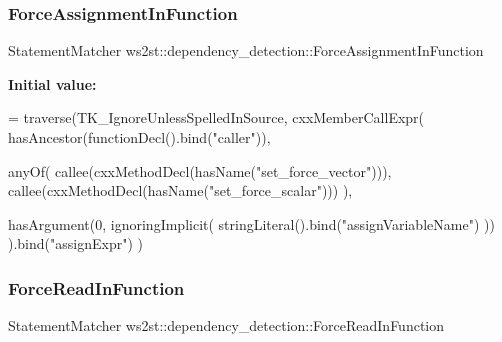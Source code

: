 \mbox{\label{namespacews2st_1_1dependency__detection_ab94bf8df1aeef0b1f73e23c616fb56aa}} 
\subsubsection{\texorpdfstring{Force\+Assignment\+In\+Function}{ForceAssignmentInFunction}}
{\footnotesize\ttfamily Statement\+Matcher ws2st\+::dependency\+\_\+detection\+::\+Force\+Assignment\+In\+Function}

{\bfseries Initial value\+:}
\begin{DoxyCode}
= traverse(TK\_IgnoreUnlessSpelledInSource, cxxMemberCallExpr(
        hasAncestor(functionDecl().bind(\textcolor{stringliteral}{"caller"})),

        anyOf(
            callee(cxxMethodDecl(hasName(\textcolor{stringliteral}{"set\_force\_vector"}))),
            callee(cxxMethodDecl(hasName(\textcolor{stringliteral}{"set\_force\_scalar"})))
        ),

        hasArgument(0, ignoringImplicit( stringLiteral().bind(\textcolor{stringliteral}{"assignVariableName"}) ))
    ).bind(\textcolor{stringliteral}{"assignExpr"})
)
\end{DoxyCode}
\mbox{\label{namespacews2st_1_1dependency__detection_ae0981b485fc9d9a27c5d5e1385a08919}} 
\subsubsection{\texorpdfstring{Force\+Read\+In\+Function}{ForceReadInFunction}}
{\footnotesize\ttfamily Statement\+Matcher ws2st\+::dependency\+\_\+detection\+::\+Force\+Read\+In\+Function}


